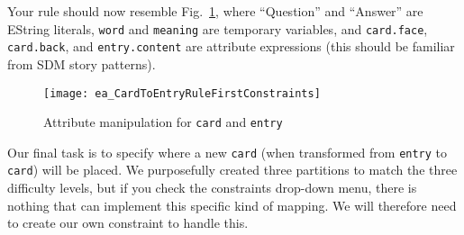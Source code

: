 \vspace{0.5cm}

Your rule should now resemble Fig.~\ref{ea:cardtoentry_2}, where ``Question'' and ``Answer'' are EString literals, \texttt{word} and \texttt{meaning} are
temporary variables, and \texttt{card.face}, \texttt{card.back}, and \texttt{entry.content} are attribute expressions (this should be familiar from SDM story
patterns).

\vspace{0.5cm}

\begin{figure}[htbp]
\begin{center}
  \texttt{[image: ea\_CardToEntryRuleFirstConstraints]}
  \caption{Attribute manipulation for \texttt{card} and \texttt{entry}}
  \label{ea:cardtoentry_2}
\end{center}
\end{figure}
\FloatBarrier

Our final task is to specify where a new \texttt{card} (when transformed from \texttt{entry} to \texttt{card}) will be placed.  We purposefully created three
partitions to match the three difficulty levels, but if you check the constraints drop-down menu, there is nothing that can implement this specific kind of
mapping. We will therefore need to create our own constraint to handle this.

